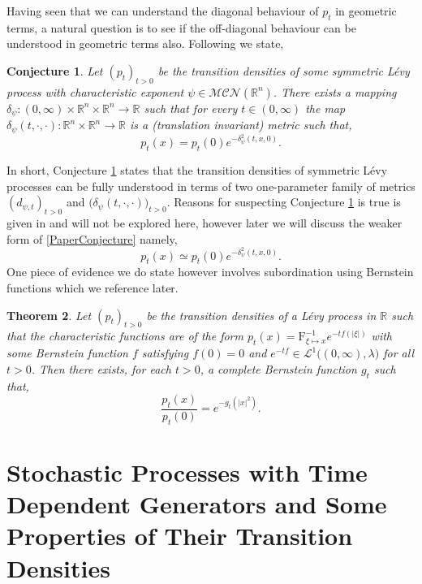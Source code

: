 \documentclass[a4paper, 12pt]{report}
\newtheorem{theorem}{Theorem}[section]
\newtheorem{conjecture}[theorem]{Conjecture}
\theoremstyle{remark}
\theoremstyle{definition}
\begin{document}
Having seen that we can understand the diagonal behaviour of $p_t$ in geometric terms, a natural question is to see if the off-diagonal behaviour can be understood in geometric terms also.  Following \cite{Paper} we state,
\begin{conjecture}\label{FAaSGRtLPConj1}
Let $(p_t)_{t > 0}$ be the transition densities of some symmetric L\'evy process with characteristic exponent $\psi \in \mathcal{MCN}(\mathbb{R}^n)$.  There exists a mapping $\delta_\psi : (0, \infty) \times \mathbb{R}^n \times \mathbb{R}^n \to \mathbb{R}$ such that for every $t \in (0, \infty)$ the map $\delta_\psi(t, \cdot, \cdot) : \mathbb{R}^n \times \mathbb{R}^n \to \mathbb{R}$ is a (translation invariant) metric such that,
\begin{equation}\label{PaperConjecture}
p_t(x) = p_t(0)e^{-\delta_\psi^2(t, x, 0)}.
\end{equation}
\end{conjecture}
In short, Conjecture \ref{FAaSGRtLPConj1} states that the transition densities of symmetric L\'evy processes can be fully understood in terms of two one-parameter family of metrics $(d_{\psi, t})_{t > 0}$ and $\big(\delta_\psi(t, \cdot, \cdot)\big)_{t > 0}$.  Reasons for suspecting Conjecture \ref{FAaSGRtLPConj1} is true is given in \cite{Paper} and will not be explored here, however later we will discuss the weaker form of \eqref{PaperConjecture} namely,
\begin{equation}
p_t(x) \simeq p_t(0)e^{-\delta_\psi^2(t, x, 0)}.
\end{equation}
 One piece of evidence we do state however involves subordination using Bernstein functions which we reference later.
\begin{theorem}\label{TDSGMeT3}
Let $(p_t)_{t > 0}$ be the transition densities of a L\'evy process in $\mathbb{R}$ such that the characteristic functions are of the form $p_t(x) = \mathrm{F}_{\xi \mapsto x}^{-1}e^{-tf(|\xi|)}$ with some Bernstein function $f$ satisfying $f(0) = 0$ and $e^{-tf} \in \mathcal{L}^1\big((0, \infty), \lambda\big)$ for all $t > 0$.  Then there exists, for each $t > 0$, a complete Bernstein function $g_t$ such that,
$$
\frac{p_t(x)}{p_t(0)} = e^{-g_t(|x|^2)}.
$$
\end{theorem}

\newpage

\part{Stochastic Processes with Time Dependent Generators and Some Properties of Their Transition Densities}
\end{document}
